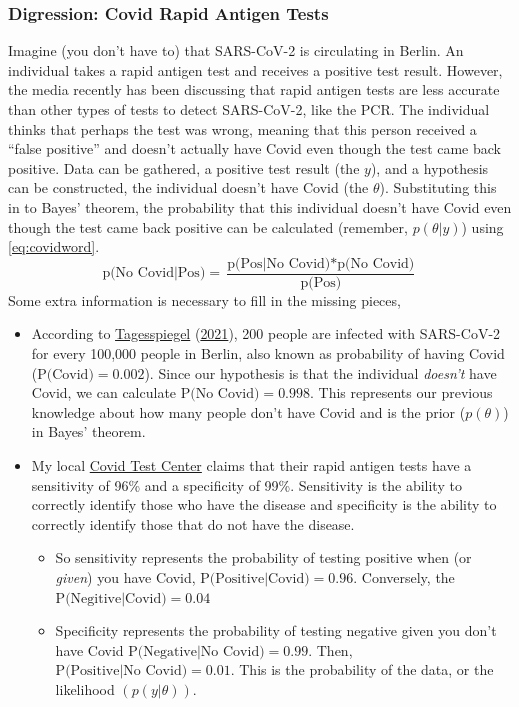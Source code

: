 \documentclass[12pt,twoside]{reedthesis}
\providecommand{\tightlist}{%
  \setlength{\itemsep}{0pt}\setlength{\parskip}{0pt}}
\begin{document}
\hypertarget{covidex}{%
\subsubsection{Digression: Covid Rapid Antigen Tests}\label{covidex}}

Imagine (you don't have to) that SARS-CoV-2 is circulating in Berlin. An individual takes a rapid antigen test and receives a positive test result. However, the media recently has been discussing that rapid antigen tests are less accurate than other types of tests to detect SARS-CoV-2, like the PCR. The individual thinks that perhaps the test was wrong, meaning that this person received a ``false positive'' and doesn't actually have Covid even though the test came back positive. Data can be gathered, a positive test result (the \(y\)), and a hypothesis can be constructed, the individual doesn't have Covid (the \(\theta\)). Substituting this in to Bayes' theorem, the probability that this individual doesn't have Covid even though the test came back positive can be calculated (remember, \(p(\theta|y)\)) using \eqref{eq:covidword}.
\begin{equation}
\text{p(No Covid|Pos)} = \frac{\text{p(Pos|No Covid)} * \text{p(No Covid)}}{\text{p(Pos)}}
\label{eq:covidword}
\end{equation}
Some extra information is necessary to fill in the missing pieces,
\begin{itemize}
\item
  According to \protect\hyperlink{ref-tagesspiegelCoronavirusKarteDeutschlandweiteFallzahlen2021}{Tagesspiegel} (\protect\hyperlink{ref-tagesspiegelCoronavirusKarteDeutschlandweiteFallzahlen2021}{2021}), 200 people are infected with SARS-CoV-2 for every 100,000 people in Berlin, also known as probability of having Covid (\(\text{P(Covid)} = 0.002\)). Since our hypothesis is that the individual \emph{doesn't} have Covid, we can calculate \(\text{P(No Covid)} = 0.998\). This represents our previous knowledge about how many people don't have Covid and is the prior (\(p(\theta)\)) in Bayes' theorem.
\item
  My local \href{https://schnell.coronatest.de/?lang=en}{Covid Test Center} claims that their rapid antigen tests have a sensitivity of 96\% and a specificity of 99\%. Sensitivity is the ability to correctly identify those who have the disease and specificity is the ability to correctly identify those that do not have the disease.
  \begin{itemize}
  \tightlist
  \item
    So sensitivity represents the probability of testing positive when (or \emph{given}) you have Covid, \(\text{P(Positive|Covid)} = 0.96\). Conversely, the \(\text{P(Negitive|Covid)} = 0.04\)
  \item
    Specificity represents the probability of testing negative given you don't have Covid \(\text{P(Negative|No Covid)} = 0.99\). Then, \(\text{P(Positive|No Covid)} = 0.01\). This is the probability of the data, or the likelihood \((p(y|\theta))\).
  \end{itemize}
\end{itemize}
\end{document}
